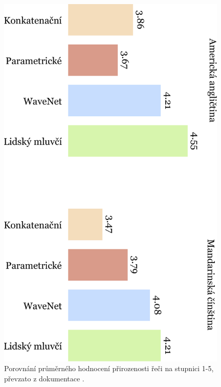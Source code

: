 \begin{figure}[h]
    \centering
    \includegraphics[angle=90, width=0.98\textwidth]{../img/wavenet-comparison.pdf}
    \caption{Porovnání průměrného hodnocení přirozenosti řeči na stupnici 1-5, převzato z dokumentace
        \citet[upraveno a přeloženo autorem]{google_tts}.}
    \label{img-wavenet}
\end{figure}